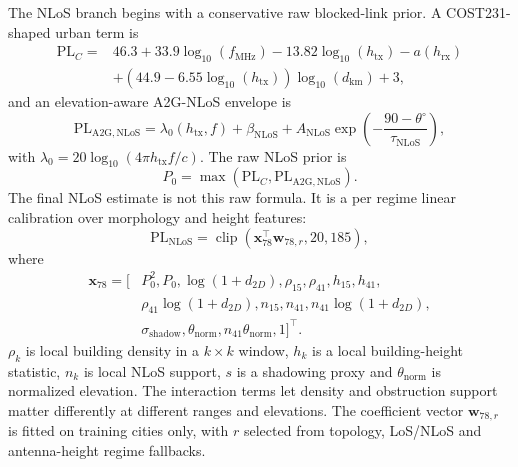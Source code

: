 The NLoS branch begins with a conservative raw blocked-link prior. A
COST231-shaped urban term is
\begin{equation}
\begin{aligned}
\mathrm{PL}_{C}
={}&46.3+33.9\log_{10}(f_{\mathrm{MHz}})
-13.82\log_{10}(h_{\mathrm{tx}})-a(h_{\mathrm{rx}})\\
&+\left(44.9-6.55\log_{10}(h_{\mathrm{tx}})\right)
\log_{10}(d_{\mathrm{km}})+3,
\end{aligned}
\label{eq:cost231}
\end{equation}
and an elevation-aware A2G-NLoS envelope is
\begin{equation}
\mathrm{PL}_{\mathrm{A2G,NLoS}}
=\lambda_0(h_{\mathrm{tx}},f)+\beta_{\mathrm{NLoS}}
+A_{\mathrm{NLoS}}\exp\!\left(-\frac{90-\theta^\circ}{\tau_{\mathrm{NLoS}}}\right),
\label{eq:a2g_nlos}
\end{equation}
with \(\lambda_0=20\log_{10}(4\pi h_{\mathrm{tx}}f/c)\). The raw NLoS prior is
\begin{equation}
P_0=\max(\mathrm{PL}_{C},\mathrm{PL}_{\mathrm{A2G,NLoS}}).
\label{eq:nlos_raw}
\end{equation}
The final NLoS estimate is not this raw formula. It is a per regime linear
calibration over morphology and height features:
\begin{equation}
\mathrm{PL}_{\mathrm{NLoS}}
=\operatorname{clip}(\mathbf{x}_{78}^{\top}\mathbf{w}_{78,r},20,185),
\label{eq:pl_nlos_final}
\end{equation}
where
\begin{equation}
\begin{aligned}
\mathbf{x}_{78}=[&
P_0^2,P_0,\log(1+d_{2D}),\rho_{15},\rho_{41},h_{15},h_{41},\\
&\rho_{41}\log(1+d_{2D}),n_{15},n_{41},
n_{41}\log(1+d_{2D}),\\
&\sigma_{\mathrm{shadow}},\theta_{\mathrm{norm}},
n_{41}\theta_{\mathrm{norm}},1]^{\top}.
\end{aligned}
\label{eq:x78}
\end{equation}
\(\rho_k\) is local building density in a \(k\times k\) window, \(h_k\) is a
local building-height statistic, \(n_k\) is local NLoS support, \(s\) is a
shadowing proxy and \(\theta_{\mathrm{norm}}\) is normalized elevation. The
interaction terms let density and obstruction support matter differently at
different ranges and elevations. The coefficient vector
\(\mathbf{w}_{78,r}\) is fitted on training cities only, with \(r\) selected
from topology, LoS/NLoS and antenna-height regime fallbacks.

